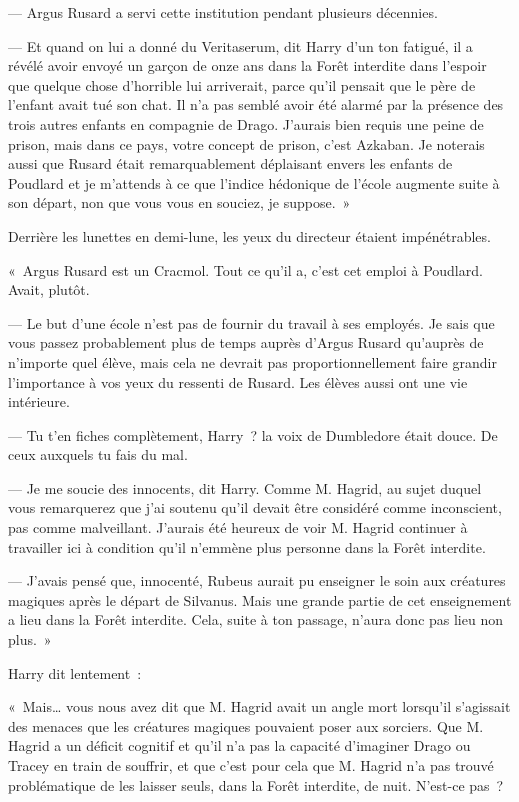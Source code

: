 --- Argus Rusard a servi cette institution pendant plusieurs décennies.

--- Et quand on lui a donné du Veritaserum, dit Harry d'un ton fatigué, il a révélé avoir envoyé un garçon de onze ans dans la Forêt interdite dans l'espoir que quelque chose d'horrible lui arriverait, parce qu'il pensait que le père de l'enfant avait tué son chat.
Il n'a pas semblé avoir été alarmé par la présence des trois autres enfants en compagnie de Drago.
J'aurais bien requis une peine de prison, mais dans ce pays, votre concept de prison, c'est Azkaban.
Je noterais aussi que Rusard était remarquablement déplaisant envers les enfants de Poudlard et je m'attends à ce que l'indice hédonique de l'école augmente suite à son départ, non que vous vous en souciez, je suppose.~»

Derrière les lunettes en demi-lune, les yeux du directeur étaient impénétrables.

«~Argus Rusard est un Cracmol.
Tout ce qu'il a, c'est cet emploi à Poudlard.
Avait, plutôt.

--- Le but d'une école n'est pas de fournir du travail à ses employés.
Je sais que vous passez probablement plus de temps auprès d'Argus Rusard qu'auprès de n'importe quel élève, mais cela ne devrait pas proportionnellement faire grandir l'importance à vos yeux du ressenti de Rusard.
Les élèves aussi ont une vie intérieure.

--- Tu t'en fiches complètement, Harry~? la voix de Dumbledore était douce.
De ceux auxquels tu fais du mal.

--- Je me soucie des innocents, dit Harry.
Comme M. Hagrid, au sujet duquel vous remarquerez que j'ai soutenu qu'il devait être considéré comme inconscient, pas comme malveillant.
J'aurais été heureux de voir M. Hagrid continuer à travailler ici à condition qu'il n'emmène plus personne dans la Forêt interdite.

--- J'avais pensé que, innocenté, Rubeus aurait pu enseigner le soin aux créatures magiques après le départ de Silvanus.
Mais une grande partie de cet enseignement a lieu dans la Forêt interdite.
Cela, suite à ton passage, n'aura donc pas lieu non plus.~»

Harry dit lentement~:

«~Mais… vous nous avez dit que M. Hagrid avait un angle mort lorsqu'il s'agissait des menaces que les créatures magiques pouvaient poser aux sorciers.
Que M. Hagrid a un déficit cognitif et qu'il n'a pas la capacité d'imaginer Drago ou Tracey en train de souffrir, et que c'est pour cela que M. Hagrid n'a pas trouvé problématique de les laisser seuls, dans la Forêt interdite, de nuit.
N'est-ce pas~?

